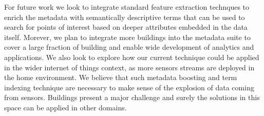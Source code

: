 For future work we look to integrate standard feature extraction technques to enrich the metadata
with semantically descriptive terms that can be used to search for points of interest based on
deeper attributes embedded in the data itself.  Morever, we plan to integrate more buildings
into the metadata suite to cover a large fraction of building and enable wide development
of analytics and applications.  We also look to explore how our current technique could be applied in the 
wider internet of things context, as more sensors streams are deployed in the home environment.
We believe that such metadata boosting and term indexing technique are necessary to make sense of
the explosion of data coming from sensors.  Buildings present a major challenge and surely the solutions
in this space can be applied in other domains.


